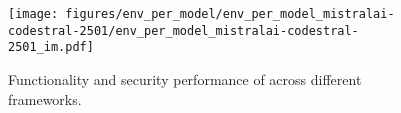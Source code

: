 
\begin{figure}[h]
    \centering
    \texttt{[image: figures/env\_per\_model/env\_per\_model\_mistralai-codestral-2501/env\_per\_model\_mistralai-codestral-2501\_im.pdf]}
    \caption{Functionality and security performance of \codestral{} across different frameworks.}
    \label{fig:env_per_model_mistralai-codestral-2501}
\end{figure}
